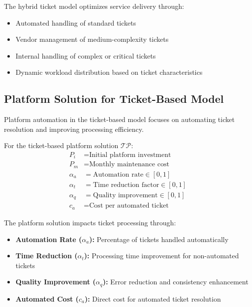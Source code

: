 \documentclass[12pt,a4paper]{article}
\newenvironment{definition}[1]
{\begin{mdframed}[style=definitionstyle,frametitle={Definition: #1}]}
{\end{mdframed}}
\newenvironment{explanation}
{\begin{mdframed}[style=explanationstyle,frametitle={Explanation}]}
{\end{mdframed}}
\begin{document}
\begin{explanation}
The hybrid ticket model optimizes service delivery through:
\begin{itemize}
    \item Automated handling of standard tickets
    \item Vendor management of medium-complexity tickets
    \item Internal handling of complex or critical tickets
    \item Dynamic workload distribution based on ticket characteristics
\end{itemize}
\end{explanation}

\subsection{Platform Solution for Ticket-Based Model}
Platform automation in the ticket-based model focuses on automating ticket resolution and improving processing efficiency.

\begin{definition}{Ticket Platform Variables}
For the ticket-based platform solution $\mathcal{TP}$:
\begin{align*}
    P_i &= \text{Initial platform investment} \\
    P_m &= \text{Monthly maintenance cost} \\
    \alpha_a &= \text{Automation rate} \in [0,1] \\
    \alpha_t &= \text{Time reduction factor} \in [0,1] \\
    \alpha_q &= \text{Quality improvement} \in [0,1] \\
    c_a &= \text{Cost per automated ticket}
\end{align*}
\end{definition}

\begin{explanation}
The platform solution impacts ticket processing through:
\begin{itemize}
    \item \textbf{Automation Rate ($\alpha_a$):} Percentage of tickets handled automatically
    \item \textbf{Time Reduction ($\alpha_t$):} Processing time improvement for non-automated tickets
    \item \textbf{Quality Improvement ($\alpha_q$):} Error reduction and consistency enhancement
    \item \textbf{Automated Cost ($c_a$):} Direct cost for automated ticket resolution
\end{itemize}
\end{explanation}
\end{document}
